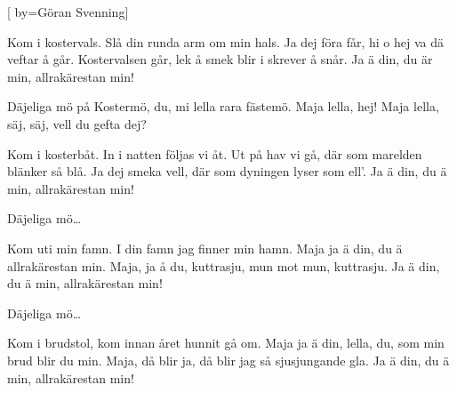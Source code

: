 


[ 	%
	by={Göran Svenning}]		%
	
\beginverse*		%
Kom i kostervals.
Slå din runda arm om min hals.
Ja dej föra får,
hi o hej va dä veftar å går.
Kostervalsen går,
lek å smek blir i skrever å snår.
Ja ä din,
du är min,
allrakärestan min!
\endverse			%

\beginchorus
Däjeliga mö på Kostermö,
du, mi lella rara fästemö.
Maja lella, hej!
Maja lella, säj,
säj, vell du gefta dej?
\endchorus

\beginverse*		%
Kom i kosterbåt.
In i natten följas vi åt.
Ut på hav vi gå,
där som marelden blänker så blå.
Ja dej smeka vell,
där som dyningen lyser som ell’.
Ja ä din, 
du ä min, 
allrakärestan min!
\endverse			%

\beginchorus
Däjeliga mö…
\endchorus

\beginverse*		%
Kom uti min famn.
I din famn jag finner min hamn.
Maja ja ä din,
du ä allrakärestan min.
Maja, ja å du,
kuttrasju, mun mot mun, kuttrasju.
Ja ä din,
du ä min,
allrakärestan min!
\endverse			%

\beginchorus
Däjeliga mö…
\endchorus


\beginverse*		%
Kom i brudstol, kom
innan året hunnit gå om.
Maja ja ä din,
lella, du, som min brud blir du min.
Maja, då blir ja,
då blir jag så sjusjungande gla.
Ja ä din,
du ä min,
allrakärestan min!
\endverse			%
\endsong			%
